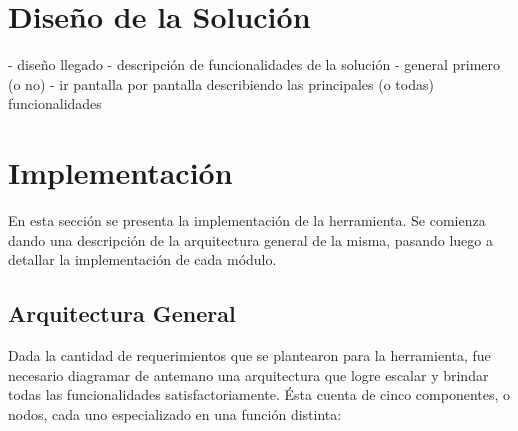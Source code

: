 \section{Diseño de la Solución}

- diseño llegado
    - descripción de funcionalidades de la solución
    - general primero (o no)
    - ir pantalla por pantalla describiendo las principales (o todas) funcionalidades


\section{Implementación}

En esta sección se presenta la implementación de la herramienta. Se comienza dando una descripción
de la arquitectura general de la misma, pasando luego a detallar la implementación de cada
módulo.


\subsection{Arquitectura General}

Dada la cantidad de requerimientos que se plantearon para la herramienta, fue necesario diagramar de
antemano una arquitectura que logre escalar y brindar todas las funcionalidades
satisfactoriamente. Ésta cuenta de cinco componentes, o nodos, cada uno especializado en una función
distinta:


